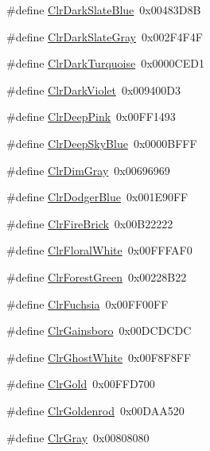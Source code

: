 \begin{DoxyCompactItemize}
\#define \hyperlink{group__primitives__api_ga2aa8de3a089f8b9238885a5a3c16a6bd}{Clr\+Dark\+Slate\+Blue}~0x00483\+D8\+B
\item 
\#define \hyperlink{group__primitives__api_gae73b114819788663620fae5317a6fa9e}{Clr\+Dark\+Slate\+Gray}~0x002\+F4\+F4\+F
\item 
\#define \hyperlink{group__primitives__api_ga932ec3218108b40bd7c141b55b9b2875}{Clr\+Dark\+Turquoise}~0x0000\+C\+E\+D1
\item 
\#define \hyperlink{group__primitives__api_ga098dfec2aaf43724525dbbb19a751654}{Clr\+Dark\+Violet}~0x009400\+D3
\item 
\#define \hyperlink{group__primitives__api_gad2f170ed992923037f09f994846c3a76}{Clr\+Deep\+Pink}~0x00\+F\+F1493
\item 
\#define \hyperlink{group__primitives__api_ga4adf764a67a5b587da3fa1146a4cec32}{Clr\+Deep\+Sky\+Blue}~0x0000\+B\+F\+F\+F
\item 
\#define \hyperlink{group__primitives__api_ga8653634d20adb6b4e93c9b113334d61c}{Clr\+Dim\+Gray}~0x00696969
\item 
\#define \hyperlink{group__primitives__api_gab1348993eda83650369c471baeaf825f}{Clr\+Dodger\+Blue}~0x001\+E90\+F\+F
\item 
\#define \hyperlink{group__primitives__api_gacaef27fd3a4d23f5c9ad80fda9bc5f8e}{Clr\+Fire\+Brick}~0x00\+B22222
\item 
\#define \hyperlink{group__primitives__api_gac3c0eeda94b0035a04bfcfe1fb9d8f29}{Clr\+Floral\+White}~0x00\+F\+F\+F\+A\+F0
\item 
\#define \hyperlink{group__primitives__api_gaa4d2952ff22d580ba1e9bdd1eec8ecfc}{Clr\+Forest\+Green}~0x00228\+B22
\item 
\#define \hyperlink{group__primitives__api_gaf7876fabbae12fb68cb4545dba4f9466}{Clr\+Fuchsia}~0x00\+F\+F00\+F\+F
\item 
\#define \hyperlink{group__primitives__api_ga7c383b431fe509f7d90b819ca9fb4188}{Clr\+Gainsboro}~0x00\+D\+C\+D\+C\+D\+C
\item 
\#define \hyperlink{group__primitives__api_gabda76330c7929253e2d36b3046bf00e2}{Clr\+Ghost\+White}~0x00\+F8\+F8\+F\+F
\item 
\#define \hyperlink{group__primitives__api_gaf952c7f19a50078f2b0e0bf44739293b}{Clr\+Gold}~0x00\+F\+F\+D700
\item 
\#define \hyperlink{group__primitives__api_ga3e005698a8de1339994d4235f3f79f9d}{Clr\+Goldenrod}~0x00\+D\+A\+A520
\item 
\#define \hyperlink{group__primitives__api_ga86d935c5fdc2e991b208e10d4744bfd4}{Clr\+Gray}~0x00808080

\end{DoxyCompactItemize}

